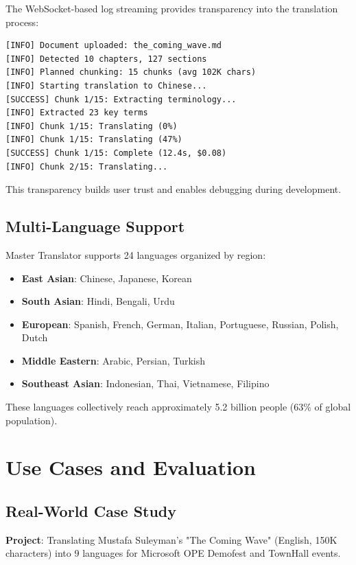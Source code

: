 \documentclass[11pt]{article}
\begin{document}
The WebSocket-based log streaming provides transparency into the translation process:

\begin{lstlisting}[caption=Sample Log Output]
[INFO] Document uploaded: the_coming_wave.md
[INFO] Detected 10 chapters, 127 sections
[INFO] Planned chunking: 15 chunks (avg 102K chars)
[INFO] Starting translation to Chinese...
[SUCCESS] Chunk 1/15: Extracting terminology...
[INFO] Extracted 23 key terms
[INFO] Chunk 1/15: Translating (0%)
[INFO] Chunk 1/15: Translating (47%)
[SUCCESS] Chunk 1/15: Complete (12.4s, $0.08)
[INFO] Chunk 2/15: Translating...
\end{lstlisting}

This transparency builds user trust and enables debugging during development.

\subsection{Multi-Language Support}

Master Translator supports 24 languages organized by region:

\begin{itemize}
    \item \textbf{East Asian}: Chinese, Japanese, Korean
    \item \textbf{South Asian}: Hindi, Bengali, Urdu
    \item \textbf{European}: Spanish, French, German, Italian, Portuguese, Russian, Polish, Dutch
    \item \textbf{Middle Eastern}: Arabic, Persian, Turkish
    \item \textbf{Southeast Asian}: Indonesian, Thai, Vietnamese, Filipino
\end{itemize}

These languages collectively reach approximately 5.2 billion people (63\% of global population).

\section{Use Cases and Evaluation}

\subsection{Real-World Case Study}

\textbf{Project}: Translating Mustafa Suleyman's "The Coming Wave" (English, 150K characters) into 9 languages for Microsoft OPE Demofest and TownHall events.
\end{document}
